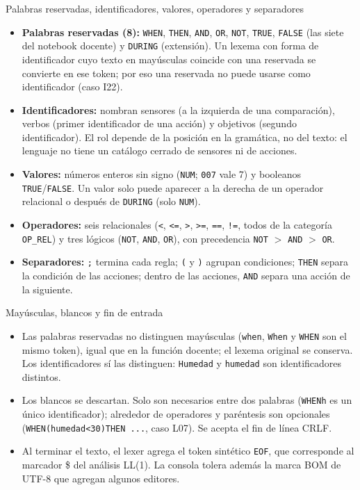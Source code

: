 \documentclass[11pt,letterpaper]{article}
\makeatletter
\renewcommand\subsection{\@startsection{subsection}{2}{\z@}{-2.6ex\@plus -1ex \@minus -.2ex}{1.0ex \@plus .2ex}%
  {\normalfont\large\bfseries}}
\newcommand{\T}[1]{\texttt{#1}}
\makeatother
\begin{document}
\subsection{Palabras reservadas, identificadores, valores, operadores y separadores}
\begin{itemize}
\item \textbf{Palabras reservadas (8):} \T{WHEN}, \T{THEN}, \T{AND}, \T{OR}, \T{NOT}, \T{TRUE}, \T{FALSE} (las
siete del notebook docente) y \T{DURING} (extensión). Un lexema con forma de identificador cuyo texto en
mayúsculas coincide con una reservada se convierte en ese token; por eso una reservada no puede usarse como
identificador (caso I22).
\item \textbf{Identificadores:} nombran sensores (a la izquierda de una comparación), verbos (primer
identificador de una acción) y objetivos (segundo identificador). El rol depende de la posición en la
gramática, no del texto: el lenguaje no tiene un catálogo cerrado de sensores ni de acciones.
\item \textbf{Valores:} números enteros sin signo (\T{NUM}; \T{007} vale 7) y booleanos \T{TRUE}/\T{FALSE}. Un
valor solo puede aparecer a la derecha de un operador relacional o después de \T{DURING} (solo \T{NUM}).
\item \textbf{Operadores:} seis relacionales (\T{<}, \T{<=}, \T{>}, \T{>=}, \T{==}, \T{!=}, todos de la categoría
\T{OP\_REL}) y tres lógicos (\T{NOT}, \T{AND}, \T{OR}), con precedencia \T{NOT} $>$ \T{AND} $>$ \T{OR}.
\item \textbf{Separadores:} \T{;} termina cada regla; \T{(} y \T{)} agrupan condiciones; \T{THEN} separa la
condición de las acciones; dentro de las acciones, \T{AND} separa una acción de la siguiente.
\end{itemize}

\subsection{Mayúsculas, blancos y fin de entrada}
\begin{itemize}
\item Las palabras reservadas no distinguen mayúsculas (\T{when}, \T{When} y \T{WHEN} son el mismo token),
igual que en la función docente; el lexema original se conserva. Los identificadores sí las distinguen:
\T{Humedad} y \T{humedad} son identificadores distintos.
\item Los blancos se descartan. Solo son necesarios entre dos palabras (\T{WHENh} es un único identificador);
alrededor de operadores y paréntesis son opcionales (\T{WHEN(humedad<30)THEN ...}, caso L07). Se acepta el
fin de línea CRLF.
\item Al terminar el texto, el lexer agrega el token sintético \T{EOF}, que corresponde al marcador \$ del
análisis LL(1). La consola tolera además la marca BOM de UTF-8 que agregan algunos editores.
\end{itemize}
\end{document}
